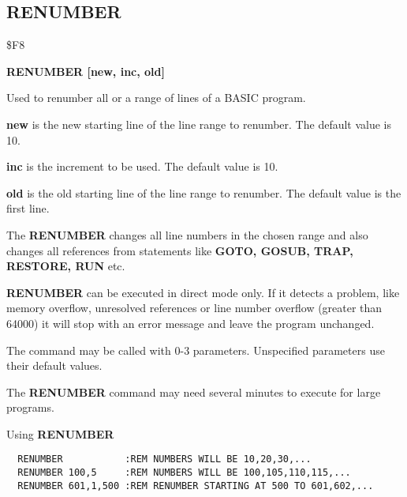 
\newpage
\subsection{RENUMBER}
\begin{description}[leftmargin=2cm,style=nextline]
\item [Token:] \$F8
\item [Format:] {\bf RENUMBER [new, inc, old]}
\item [Usage:] Used to renumber all or
               a range of lines of a BASIC program.

               {\bf new } is the new starting line of the
               line range to renumber.
               The default value is 10.

               {\bf inc } is the increment to be used.
               The default value is 10.

               {\bf old } is the old starting line of the
               line range to renumber.
               The default value is the first line.

               The {\bf RENUMBER} changes all line numbers in
               the chosen range and also changes all references
               from statements like {\bf GOTO, GOSUB, TRAP,
               RESTORE, RUN} etc.

               {\bf RENUMBER} can be executed in direct mode only.
               If it detects a problem, like memory overflow,
               unresolved references or line number overflow
               (greater than 64000) it will stop with an error
               message and leave the program unchanged.

               The command may be called with 0-3 parameters.
               Unspecified parameters use their default values.

\item [Remarks:] The {\bf RENUMBER} command may need several
                 minutes to execute for large programs.

\item [Example:] Using {\bf RENUMBER}
\begin{tcolorbox}[colback=black,coltext=white]
\verbatimfont{\codefont}
\begin{verbatim}
  RENUMBER           :REM NUMBERS WILL BE 10,20,30,...
  RENUMBER 100,5     :REM NUMBERS WILL BE 100,105,110,115,...
  RENUMBER 601,1,500 :REM RENUMBER STARTING AT 500 TO 601,602,...
\end{verbatim}
\end{tcolorbox}
\end{description}

